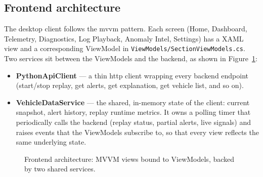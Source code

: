 \subsection{Frontend architecture}

The desktop client follows the \gls{mvvm} pattern. Each screen (Home, Dashboard, Telemetry, Diagnostics, Log Playback, Anomaly Intel, Settings) has a XAML view and a corresponding ViewModel in \texttt{ViewModels/SectionViewModels.cs}. Two services sit between the ViewModels and the backend, as shown in Figure~\ref{fig:frontend-arch}:

\begin{itemize}
    \item \textbf{PythonApiClient} — a thin \gls{http} client wrapping every backend endpoint (start/stop replay, get alerts, get explanation, get vehicle list, and so on).
    \item \textbf{VehicleDataService} — the shared, in-memory state of the client: current snapshot, alert history, replay runtime metrics. It owns a polling timer that periodically calls the backend (replay status, partial alerts, live signals) and raises events that the ViewModels subscribe to, so that every view reflects the same underlying state.
\end{itemize}

\begin{figure}[H]
\centering
{}
\caption{Frontend architecture: MVVM views bound to ViewModels, backed by two shared services.}
\label{fig:frontend-arch}
\end{figure}

